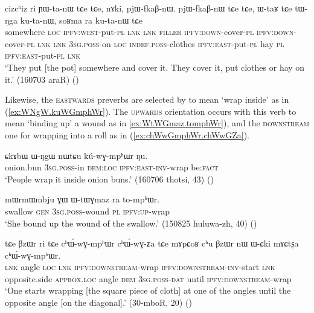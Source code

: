 \begin{exe}
\ex \label{ex:WtaR.kutanW}
\gll  cizcʰiz ri ɲɯ-ta-nɯ tɕe tɕe, nɤki, pjɯ-fkaβ-nɯ. pjɯ-fkaβ-nɯ tɕe tɕe, ɯ-taʁ tɕe tɯ-ŋga ku-ta-nɯ, soʁma ra ku-ta-nɯ tɕe \\
somewhere \textsc{loc} \textsc{ipfv}:\textsc{west}-put-\textsc{pl} \textsc{lnk} \textsc{lnk} \textsc{filler} \textsc{ipfv}:\textsc{down}-cover-\textsc{pl} \textsc{ipfv}:\textsc{down}-cover-\textsc{pl} \textsc{lnk} \textsc{lnk} \textsc{3sg}.\textsc{poss}-on \textsc{loc} \textsc{indef}.\textsc{poss}-clothes \textsc{ipfv}:\textsc{east}-put-\textsc{pl} hay \textsc{pl} \textsc{ipfv}:\textsc{east}-put-\textsc{pl} \textsc{lnk} \\
\glt `They put [the pot] somewhere and cover it. They cover it, put clothes or hay on it.' (160703 araR)
()
\end{exe}

Likewise, the \textsc{eastwards} preverbs are selected by  to mean `wrap inside' as in (\ref{ex:WNgW.kuWGmphWr}). The  \textsc{upwards} orientation occurs with this verb to mean `binding up' a wound as in \ref{ex:WtWGmaz.tomphWr}), and the \textsc{downstream} one for wrapping into a roll as in (\ref{ex:chWwGmphWr.chWwGZa}).
 
\begin{exe}
\ex \label{ex:WNgW.kuWGmphWr}
\gll  ɕkɤbɯ ɯ-ŋgɯ nɯtɕu kú-wɣ-mpʰɯr ŋu. \\
onion.bun \textsc{3sg}.\textsc{poss}-in \textsc{dem}:\textsc{loc} \textsc{ipfv}:\textsc{east}-\textsc{inv}-wrap be:\textsc{fact} \\
\glt `People wrap it inside onion buns.' (160706 thotsi, 43)
()
 \end{exe}

\begin{exe}
\ex \label{ex:WtWGmaz.tomphWr}
\gll mɯrmɯmbju ɣɯ ɯ-tɯɣmaz ra to-mpʰɯr. \\
swallow \textsc{gen} \textsc{3sg}.\textsc{poss}-wound \textsc{pl} \textsc{ipfv}:\textsc{up}-wrap \\
\glt `She bound up the wound of the swallow.' (150825 huluwa-zh, 40)
()
  \end{exe}
  
\begin{exe}
\ex \label{ex:chWwGmphWr.chWwGZa}
\gll  tɕe βzɯr ri tɕe cʰɯ́-wɣ-mpʰɯr cʰɯ́-wɣ-ʑa tɕe  mɤpɕoʁ cʰu βzɯr nɯ ɯ-ɕki mɤɕtʂa cʰɯ́-wɣ-mpʰɯr. \\
\textsc{lnk} angle \textsc{loc} \textsc{lnk} \textsc{ipfv}:\textsc{downstream}-wrap \textsc{ipfv}:\textsc{downstream}-\textsc{inv}-start \textsc{lnk} opposite.side \textsc{approx}.\textsc{loc} angle \textsc{dem} \textsc{3sg}.\textsc{poss}-\textsc{dat} until \textsc{ipfv}:\textsc{downstream}-wrap \\
\glt `One starts wrapping [the square piece of cloth] at one of the angles until the opposite angle [on the diagonal].' (30-mboR, 20)
()
 \end{exe}
  
